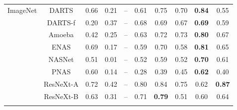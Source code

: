 \documentclass{article}
\begin{document}
\begin{table}[t]
{\begin{tabular}{lcccc|ccccc}
ImageNet & DARTS & 0.66 & 0.21 & -- &0.61 & {0.75} & {0.70} & {\textbf{0.84}} & 0.55 \\
 & DARTS-f & 0.20 & 0.37 & --  &{0.68} & {0.69} & 0.67 & {\textbf{0.69}} &  0.59 \\
 & Amoeba & 0.42 & 0.25 & -- & 0.63 & {0.72} & {0.73} &  {\textbf{0.80}} & 0.67 \\
 & ENAS & {0.69} & 0.17 & -- &0.59 & {0.70} & 0.58 & {\textbf{0.81}} & {0.65} \\
 & NASNet & 0.51 & 0.01 & -- &0.52 &  {0.59} & 0.52 &  {\textbf{0.70}} & {0.61} \\
 & PNAS & {0.60} & 0.14 & -- & 0.28 & 0.39 & {0.45} & {\textbf{0.62}} & 0.40 \\
 & ResNeXt-A & 0.72 & 0.42 & -- & {0.80}& {0.84}& 0.75 & 0.62 & {\textbf{0.87}} \\
 & ResNeXt-B & 0.63 & 0.31 & -- & {0.71}& {\textbf{0.79}} & 0.51 & 0.60 & {0.64} \\
\Xhline{0.8pt}
\end{tabular}}
 \vspace{-14pt}
\end{table}
\normalsize{}


\vspace{-5pt}
\end{document}
